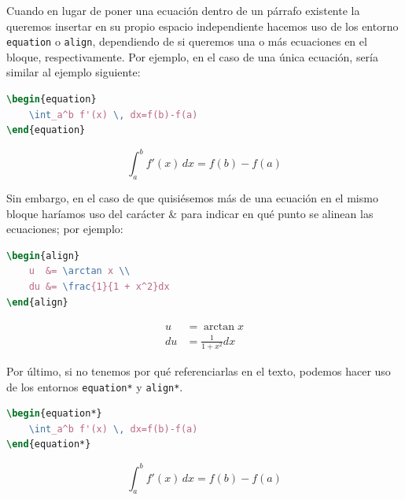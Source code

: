 Cuando en lugar de poner una ecuación dentro de un párrafo existente la queremos insertar en su propio espacio independiente hacemos uso de los entorno \texttt{equation} o \texttt{align}, dependiendo de si queremos una o más ecuaciones en el bloque, respectivamente. Por ejemplo, en el caso de una única ecuación, sería similar al ejemplo siguiente:

\begin{minipage}[c]{.5\textwidth}
\begin{lstlisting}[language=tex]
\begin{equation}
	\int_a^b f'(x) \, dx=f(b)-f(a)
\end{equation}
\end{lstlisting}
\end{minipage}%
\begin{minipage}[c]{.5\textwidth}
\begin{equation}
    \int_a^b f'(x) \, dx=f(b)-f(a)
\end{equation}
\end{minipage}

Sin embargo, en el caso de que quisiésemos más de una ecuación en el mismo bloque haríamos uso del carácter \& para indicar en qué punto se alinean las ecuaciones; por ejemplo:

\begin{minipage}[c]{.5\textwidth}
\begin{lstlisting}[language=tex]
\begin{align}
    u  &= \arctan x \\ 
    du &= \frac{1}{1 + x^2}dx
\end{align}
\end{lstlisting}
\end{minipage}%
\begin{minipage}[c]{.5\textwidth}
\begin{align}
    u  &= \arctan x \\ 
    du &= \frac{1}{1 + x^2}dx
\end{align}
\end{minipage}

Por último, si no tenemos por qué referenciarlas en el texto, podemos hacer uso de los entornos \texttt{equation*} y \texttt{align*}.

\begin{minipage}[c]{.5\textwidth}
\begin{lstlisting}[language=tex]
\begin{equation*}
    \int_a^b f'(x) \, dx=f(b)-f(a)
\end{equation*}
\end{lstlisting}
\end{minipage}%
\begin{minipage}[c]{.5\textwidth}
\begin{equation*}
    \int_a^b f'(x) \, dx=f(b)-f(a)
\end{equation*}
\end{minipage}

